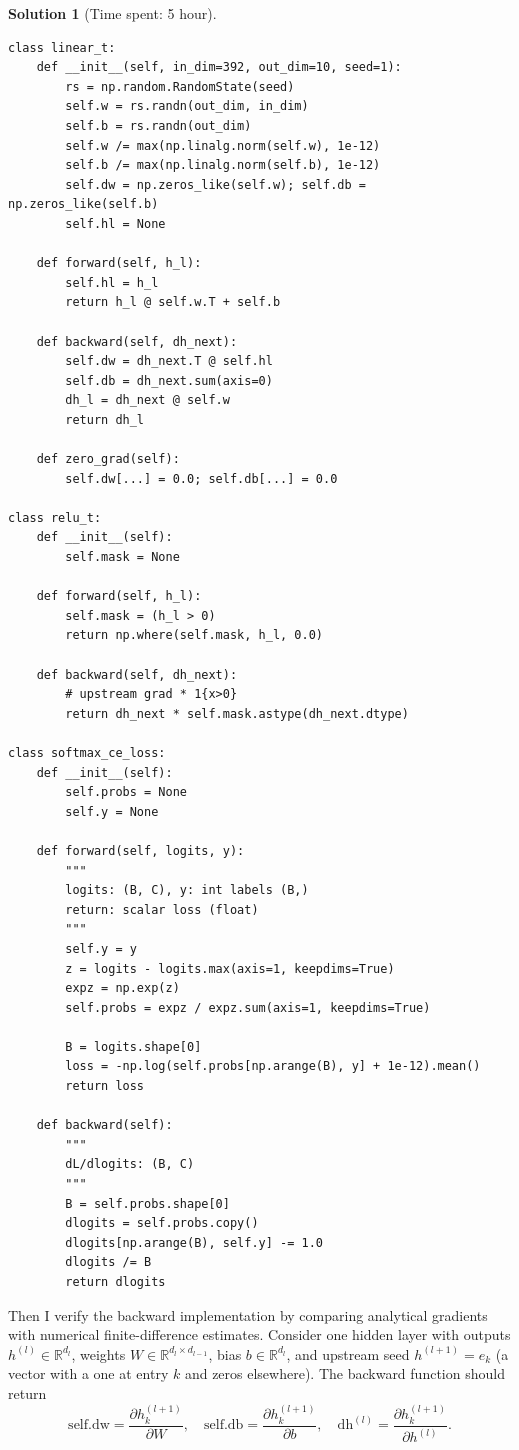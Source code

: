 \documentclass[11pt, reqno, letterpaper, twoside]{amsart}
\theoremstyle{plain}
\theoremstyle{definition}
\newtheorem{solution}[theorem]{Solution}
\begin{document}
\begin{solution}[Time spent: 5 hour]
\begin{lstlisting}
class linear_t:
    def __init__(self, in_dim=392, out_dim=10, seed=1):
        rs = np.random.RandomState(seed)
        self.w = rs.randn(out_dim, in_dim)
        self.b = rs.randn(out_dim)
        self.w /= max(np.linalg.norm(self.w), 1e-12)
        self.b /= max(np.linalg.norm(self.b), 1e-12)
        self.dw = np.zeros_like(self.w); self.db = np.zeros_like(self.b)
        self.hl = None

    def forward(self, h_l):  
        self.hl = h_l
        return h_l @ self.w.T + self.b

    def backward(self, dh_next):  
        self.dw = dh_next.T @ self.hl          
        self.db = dh_next.sum(axis=0)          
        dh_l = dh_next @ self.w                
        return dh_l

    def zero_grad(self):
        self.dw[...] = 0.0; self.db[...] = 0.0

class relu_t:
    def __init__(self):
        self.mask = None  

    def forward(self, h_l):
        self.mask = (h_l > 0)
        return np.where(self.mask, h_l, 0.0)

    def backward(self, dh_next):
        # upstream grad * 1{x>0}
        return dh_next * self.mask.astype(dh_next.dtype)

class softmax_ce_loss:
    def __init__(self):
        self.probs = None  
        self.y = None

    def forward(self, logits, y):
        """
        logits: (B, C), y: int labels (B,)
        return: scalar loss (float)
        """
        self.y = y
        z = logits - logits.max(axis=1, keepdims=True)  
        expz = np.exp(z)
        self.probs = expz / expz.sum(axis=1, keepdims=True)  

        B = logits.shape[0]
        loss = -np.log(self.probs[np.arange(B), y] + 1e-12).mean()
        return loss

    def backward(self):
        """
        dL/dlogits: (B, C)
        """
        B = self.probs.shape[0]
        dlogits = self.probs.copy()
        dlogits[np.arange(B), self.y] -= 1.0   
        dlogits /= B
        return dlogits
\end{lstlisting}

Then I verify the backward implementation by comparing analytical gradients with numerical
finite-difference estimates. Consider one hidden layer with outputs
$h^{(l)} \in \mathbb{R}^{d_l}$, weights $W \in \mathbb{R}^{d_l \times d_{l-1}}$, bias $b \in \mathbb{R}^{d_l}$,
and upstream seed $h^{(l+1)} = e_k$ (a vector with a one at entry $k$ and zeros elsewhere).
The backward function should return
\[
\text{self.dw} = \frac{\partial h^{(l+1)}_k}{\partial W},\quad
\text{self.db} = \frac{\partial h^{(l+1)}_k}{\partial b},\quad
\text{dh}^{(l)} = \frac{\partial h^{(l+1)}_k}{\partial h^{(l)}} .
\]


\end{solution}
\end{document}
